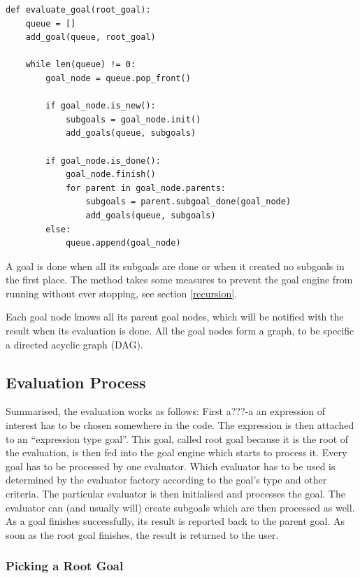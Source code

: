 \documentclass[12pt,halfparskip,DIV11,BCOR10mm]{scrreprt}
\begin{document}
\begin{lstlisting}
def evaluate_goal(root_goal):
    queue = []
    add_goal(queue, root_goal)

    while len(queue) != 0:
        goal_node = queue.pop_front()

        if goal_node.is_new():
            subgoals = goal_node.init()
            add_goals(queue, subgoals)

        if goal_node.is_done():
            goal_node.finish()
            for parent in goal_node.parents:
                subgoals = parent.subgoal_done(goal_node)
                add_goals(queue, subgoals)
        else:
            queue.append(goal_node)
\end{lstlisting}

A goal is done when all its subgoals are done or when it created no subgoals in the first place. The  method takes some measures to prevent the goal engine from running without ever stopping, see section \vref{recursion}.

Each goal node knows all its parent goal nodes, which will be notified with the result when its evaluation is done. All the goal nodes form a graph, to be specific a directed acyclic graph (DAG).

\subsection{Evaluation Process}

Summarised, the evaluation works as follows: First a???-a an expression of interest has to be chosen somewhere in the code. The expression is then attached to an ``expression type goal''. This goal, called root goal because it is the root of the evaluation, is then fed into the goal engine which starts to process it. Every goal has to be processed by one evaluator. Which evaluator has to be used is determined by the evaluator factory according to the goal's type and other criteria. The particular evaluator is then initialised and processes the goal. The evaluator can (and usually will) create subgoals which are then processed as well. As a goal finishes successfully, its result is reported back to the parent goal. As soon as the root goal finishes, the result is returned to the user.

\subsubsection{Picking a Root Goal}
\end{document}
